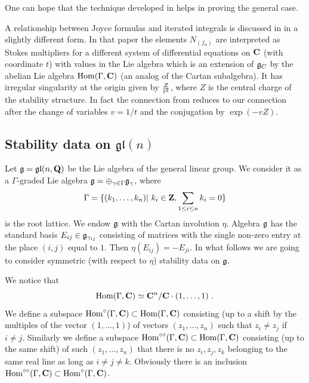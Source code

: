 \documentclass[12pt]{article}
\begin{document}


One can hope that the technique developed in \cite{Jo1} helps in proving the general case.








A  relationship  between Joyce formulas and iterated integrals is discussed in \cite{BrTL} in a slightly different form. In that paper
the elements $N_{(f_{\alpha})}$ are interpreted as Stokes multipliers for a different system of differential
equations on ${\bf C}$ (with coordinate $t$) with values in the Lie algebra which is an extension of ${\mathfrak g}_C$ by the abelian Lie algebra $\operatorname{Hom}(\Gamma,{\bf C})$ (an analog of the Cartan subalgebra).  It has irregular singularity at the origin given by $Z\over{t^2}$, where $Z$ is the central charge of the stability structure. In fact the connection from \cite{BrTL} reduces to our connection after
the change of variables $v=1/t$ and the conjugation by $\exp(-vZ)$.


\subsection{Stability data on ${\mathfrak{gl}}(n)$}

Let ${\mathfrak g}={\mathfrak{gl}}(n,{\bf Q})$ be the Lie algebra of the general linear group. We consider it as a $\Gamma$-graded Lie algebra ${\mathfrak g}=\oplus_{\gamma \in \Gamma}{\mathfrak g}_{\gamma}$,  where $$\Gamma=\{(k_1,\dots,k_n)|\,\,k_i\in {\bf Z}, \sum_{1\le i\le n}k_i=0\}$$ is the root lattice. We endow ${\mathfrak g}$ with the Cartan involution $\eta$. Algebra ${\mathfrak g}$ has 
 the standard basis $E_{ij}\in {\mathfrak g}_{\gamma_{ij}}$  consisting of matrices with the single non-zero entry at the place $(i,j)$ equal to $1$. Then $\eta(E_{ij})=-E_{ji}$.
In what follows we are going to consider symmetric (with respect to $\eta$) stability data on ${\mathfrak g}$.

We notice that  $$\operatorname{Hom}(\Gamma,{\bf C})\simeq {\bf C}^n/{\bf C}\cdot(1,\dots,1)\,\,.$$ We define a subspace $\operatorname{Hom}^\circ(\Gamma,{\bf C})\subset \operatorname{Hom}(\Gamma,{\bf C})$ consisting (up to a shift by the multiples of the vector $(1,\dots,1)$) of vectors $(z_1,\dots,z_n)$ such that $z_i\ne z_j$ if $i\ne j$. Similarly we define a subspace $\operatorname{Hom}^{\circ\circ}(\Gamma,{\bf C})\subset \operatorname{Hom}(\Gamma,{\bf C})$ consisting (up to the same shift) of such $(z_1,\dots,z_n)$ that there is no $z_i,z_j,z_k$ belonging to the same real line as long as $i\ne j\ne k$. Obviously there is an inclusion $\operatorname{Hom}^{\circ\circ}(\Gamma,{\bf C})\subset \operatorname{Hom}^\circ(\Gamma,{\bf C})$.
\end{document}
